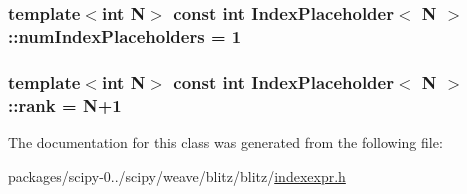 \subsubsection[{num\+Index\+Placeholders}]{\setlength{\rightskip}{0pt plus 5cm}template$<$int N$>$ const int {\bf Index\+Placeholder}$<$ {\bf N} $>$\+::num\+Index\+Placeholders = 1\hspace{0.3cm}{\ttfamily [static]}}\label{classIndexPlaceholder_a714db33b62851f95a15d3ab461156657}
\hypertarget{classIndexPlaceholder_aefaf88de12441fffbf9dfd800805bb75}{}
\subsubsection[{rank}]{\setlength{\rightskip}{0pt plus 5cm}template$<$int N$>$ const int {\bf Index\+Placeholder}$<$ {\bf N} $>$\+::rank = {\bf N}+1\hspace{0.3cm}{\ttfamily [static]}}\label{classIndexPlaceholder_aefaf88de12441fffbf9dfd800805bb75}


The documentation for this class was generated from the following file\+:\begin{DoxyCompactItemize}
\item 
packages/scipy-\/0../scipy/weave/blitz/blitz/\hyperlink{indexexpr_8h}{indexexpr.\+h}\end{DoxyCompactItemize}
